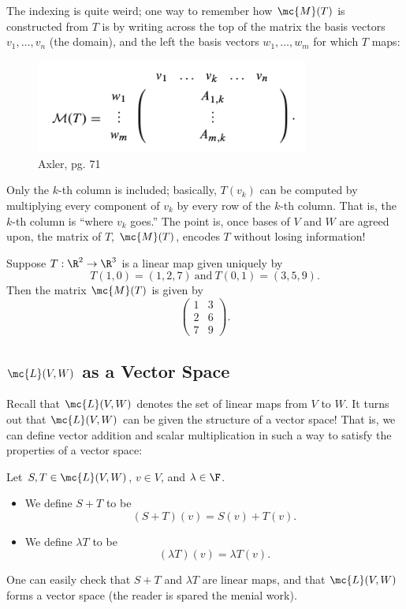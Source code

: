 \documentclass[math0540-lecture-notes.tex]{subfiles}
\begin{document}
The indexing is quite weird; one way to remember how $\mc{M}(T)$ is constructed from $T$ is by
writing across the top of the matrix the basis vectors $v_1,\ldots,v_n$ (the domain), and the left
the basis vectors $ w_1,\ldots,w_m$ for which $T$ maps:
\begin{figure}[htpb]
  \centering
  \includegraphics[width=0.8\textwidth]{axler3cmatrix.png}
  \caption{Axler, pg. 71}
  \label{fig:1}
\end{figure}

Only the $k$-th column is included; basically, $T(v_k)$ can be computed by multiplying every
component of $v_k$ by every row of the $k$-th column. That is, the $k$-th column is ``where $v_k$
goes.'' The point is, once bases of $V$ and $W$ are agreed upon, the matrix of $T$, $\mc{M}(T)$,
encodes $T$ without losing information!
\begin{example}
  Suppose $T:\R^2\to \R^3$ is a linear map given uniquely by \[
    T(1,0)=(1,2,7) ~\text{and}~ T(0,1)=(3,5,9)
  .\] Then the matrix $ \mc{M}(T)$ is given by \[
  \begin{pmatrix} 1&3\\2&6\\7&9 \end{pmatrix} 
  .\] 
\end{example}

\subsection{$\mc{L}(V,W)$ as a Vector Space}

Recall that $\mc{L}(V,W)$ denotes the set of linear maps from $V$ to $W$. It turns out that
$\mc{L}(V,W)$ can be given the structure of a vector space! That is, we can define vector addition
and scalar multiplication in such a way to satisfy the properties of a vector space:
\begin{definition}{}
  Let $S,T\in \mc{L}(V,W)$, $v\in V$, and $\lambda\in \F $.
  \begin{itemize}
    \item We define $S+T$ to be \[
      (S+T)(v)=S(v)+T(v)
    .\] 
    \item We define $\lambda T$ to be \[
        (\lambda T)(v) = \lambda T(v)
    .\] 
  \end{itemize}
  One can easily check that $S+T$ and $ \lambda T$ are linear maps, and that $\mc{L}(V,W)$ forms a
  vector space (the reader is spared the menial work).
\end{definition}
\end{document}

